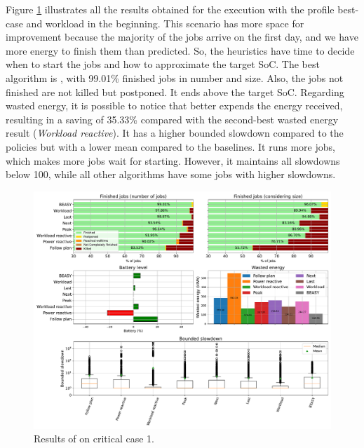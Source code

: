 Figure \ref{fig:beasy_critical_1} illustrates all the results obtained for the execution with the profile best-case and workload in the beginning. This scenario has more space for improvement because the majority of the jobs arrive on the first day, and we have more energy to finish them than predicted. So, the heuristics have time to decide when to start the jobs and how to approximate the target SoC. The best algorithm is \emph{\systemName}, with 99.01\% finished jobs in number and size. Also, the jobs not finished are not killed but postponed. It ends above the target SoC. Regarding wasted energy, it is possible to notice that \emph{\systemName} better expends the energy received, resulting in a saving of 35.33\% compared with the second-best wasted energy result (\emph{Workload reactive}). It has a higher bounded slowdown compared to the policies but with a lower mean compared to the baselines. It runs more jobs, which makes more jobs wait for starting. However, it maintains all slowdowns below 100, while all other algorithms have some jobs with higher slowdowns.

\begin{figure}[!htb]
    \centering
    \includegraphics[scale=0.39]{Images/Heuristic/profile_best_workload_1_with_noise.pdf}
    \caption{Results of \emph{\systemName} on critical case 1.}
    \label{fig:beasy_critical_1}
\end{figure}

